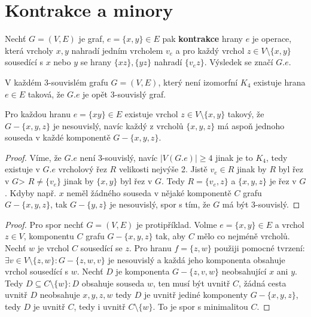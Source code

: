 \chapter{Kontrakce a minory}

\begin{definice}
	Nechť $G = (V,E)$ je graf, $e = \{x,y\} \in E$ pak \textbf{kontrakce} hrany $e$ je operace, která vrcholy $x,y$ nahradí jedním vrcholem $v_{e}$ a pro každý vrchol $z \in V \setminus \{x,y\}$ sousedící s $x$ nebo $y$ se hrany $\{xz\},\{yz\}$ nahradí $\{v_{e}z\}$. Výsledek se značí $G.e$.
\end{definice}

\begin{lemma}
	V každém 3-souvislém grafu $G = (V,E)$, který není izomorfní $K_{4}$ existuje hrana $e \in E$ taková, že $G.e$ je opět 3-souvislý graf.
\end{lemma}

\begin{tvrz}
	Pro každou hranu $e = \{xy\} \in E$ existuje vrchol $z \in V \setminus \{x,y\}$ takový, že $G - \{x,y,z\}$ je nesouvislý, navíc každý z vrcholů $\{x,y,z\}$ má aspoň jednoho souseda v každé komponentě $G-\{x,y,z\}$.
\end{tvrz}

\begin{proof}
	Víme, že $G.e$ není 3-souvislý, navíc $|V(G.e)| \geq 4$ jinak je to $K_{4}$, tedy existuje v $G.e$ vrcholový řez $R$ velikosti nejvýše 2. Jistě $v_{e} \in R$ jinak by $R$ byl řez v $G$> $R \neq \{v_{e}\}$ jinak by $\{x,y\}$ byl řez v $G$. Tedy $R = \{v_{e},z\}$ a $\{x,y,z\}$ je řez v $G$. Kdyby např. $x$ neměl žádného souseda v nějaké komponentě $C$ grafu $G - \{x,y,z\}$, tak $G - \{y,z\}$ je nesouvislý, spor s tím, že $G$ má být 3-souvislý.
\end{proof}

\begin{proof}
	Pro spor nechť $G = (V,E)$ je protipříklad. Volme $e = \{x,y\} \in E$ a vrchol $z \in V$, komponentu $C$ grafu $G - \{x,y,z\}$ tak, aby $C$ mělo co nejméně vrcholů. Nechť $w$ je vrchol $C$ sousedící se $z$. Pro hranu $f = \{z,w\}$ použiji pomocné tvrzení: $\exists v \in V \setminus \{z,w\}: G -\{z,w,v\}$ je nesouvislý a každá jeho komponenta obsahuje vrchol sousedící s $w$. Nechť $D$ je komponenta $G - \{z,v,w\}$ neobsahující $x$ ani $y$. Tedy $D \subseteq C \setminus \{w\}: D$ obsahuje souseda $w$, ten musí být uvnitř $C$, žádná cesta uvnitř $D$ neobsahuje $x,y,z,w$ tedy $D$ je uvnitř jediné komponenty $G -\{x,y,z\}$, tedy $D$ je uvnitř $C$, tedy i uvnitř $C \setminus \{w\}$. To je spor s minimalitou $C$.
\end{proof}

